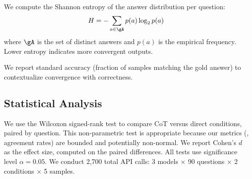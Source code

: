  We compute the Shannon entropy of the answer distribution per question:
\begin{equation}
H = -\sum_{a \in \gA} p(a) \log_2 p(a)
\label{eq:entropy}
\end{equation}
where $\gA$ is the set of distinct answers and $p(a)$ is the empirical frequency. Lower entropy indicates more convergent outputs.

 We report standard accuracy (fraction of samples matching the gold answer) to contextualize convergence with correctness.

\subsection{Statistical Analysis}

We use the Wilcoxon signed-rank test to compare CoT versus direct conditions, paired by question. This non-parametric test is appropriate because our metrics (\aar, agreement rates) are bounded and potentially non-normal. We report Cohen's $d$ as the effect size, computed on the paired differences. All tests use significance level $\alpha = 0.05$. We conduct 2,700 total API calls: 3 models $\times$ 90 questions $\times$ 2 conditions $\times$ 5 samples.
